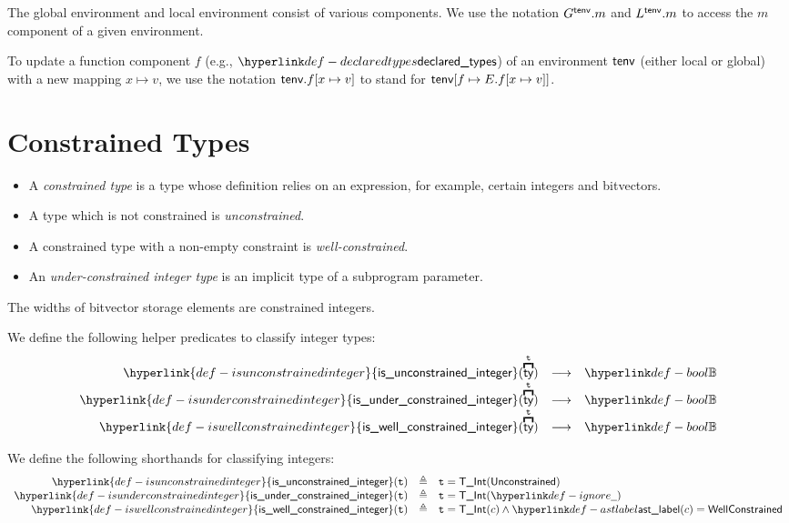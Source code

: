 \documentclass{book}
\newcommand\isunconstrainedinteger[0]{\hyperlink{def-isunconstrainedinteger}{\textsf{is\_unconstrained\_integer}}}
\newcommand\isunderconstrainedinteger[0]{\hyperlink{def-isunderconstrainedinteger}{\textsf{is\_under\_constrained\_integer}}}
\newcommand\iswellconstrainedinteger[0]{\hyperlink{def-iswellconstrainedinteger}{\textsf{is\_well\_constrained\_integer}}}
\newcommand\vt[0]{\texttt{t}}
\begin{document}
The global environment and local environment consist of various components.
We use the notation $G^{\textsf{tenv}}.m$ and $L^{\textsf{tenv}}.m$ to access the $m$ component of a given environment.

To update a function component $f$ (e.g., $\declaredtypes$) of an environment $\textsf{tenv}$ (either local or global)
with a new mapping $x \mapsto v$, we use the notation $\textsf{tenv}.f[x \mapsto v]$ to stand for $\textsf{tenv}[f \mapsto E.f[x \mapsto v]]$.


\section{Constrained Types}
\begin{itemize}
  \item A \emph{constrained type} is a type whose definition relies on an expression, for example, certain integers and bitvectors.
  \item A type which is not constrained is \emph{unconstrained}.
  \item A constrained type with a non-empty constraint is \emph{well-constrained}.
  \item An \emph{under-constrained integer type} is an implicit type of a subprogram parameter.
  \end{itemize}
The widths of bitvector storage elements are constrained integers.

\hypertarget{def-isunconstrainedinteger}{}
\hypertarget{def-isunderconstrainedinteger}{}
\hypertarget{def-iswellconstrainedinteger}{}
We define the following helper predicates to classify integer types:
\[
  \begin{array}{rcl}
  \isunconstrainedinteger(\overname{\ty}{\vt}) &\aslto& \Bool\\
  \isunderconstrainedinteger(\overname{\ty}{\vt}) &\aslto& \Bool\\
  \iswellconstrainedinteger(\overname{\ty}{\vt}) &\aslto& \Bool
  \end{array}
\]

We define the following shorthands for classifying integers:
\[
  \begin{array}{rcl}
  \isunconstrainedinteger(\vt) &\triangleq& \vt = \TInt(\unconstrained)\\
  \isunderconstrainedinteger(\vt) &\triangleq& \vt = \TInt(\Ignore)\\
  \iswellconstrainedinteger(\vt) &\triangleq& \vt = \TInt(c) \land \astlabel(c)=\wellconstrained\\
\end{array}
\]
\end{document}
